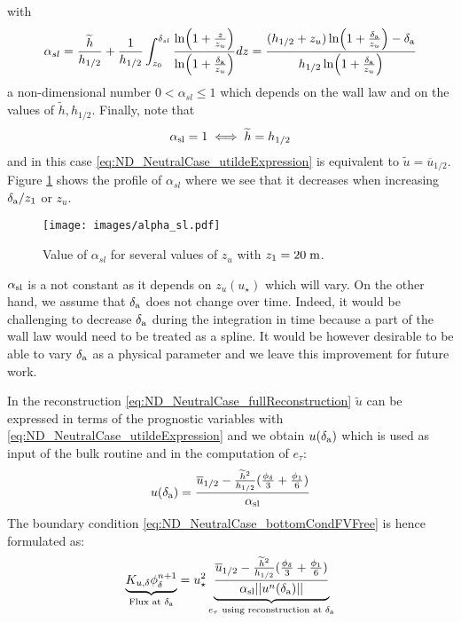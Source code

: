 with 
\begin{equation}
	\alpha_{sl} =
\frac{\widetilde{h}}{{h_{1/2}}} + \frac{1}{{h_{1/2}}}\int_{z_0}^{\delta_{sl}}
\frac{\ln(1+\frac{z}{z_{u}})}{\ln(1+\frac{\delta_{\rm a}}{z_{u}})}dz
= \frac{(h_{1/2} + z_{u})
\ln(1+\frac{\delta_{\rm a}}{z_{u}}) - \delta_{\rm a}}{
	h_{1/2}\ln(1+\frac{\delta_{\rm a}}{z_{u}})}
\end{equation}
a non-dimensional number $0 < \alpha_{sl} \leq 1$
which depends on the wall law and
on the values of $\widetilde{h}, h_{1/2}$. Finally, note that
\begin{equation}
	\alpha_{\rm sl} = 1 \iff \widetilde{h}=h_{1/2}
\end{equation}
and in this case \eqref{eq:ND_NeutralCase_utildeExpression} is
equivalent to $\widetilde{u} = \overline{u}_{1/2}$.
Figure \ref{fig:ND_NeutralCase_alpha_sl} shows the
profile of $\alpha_{sl}$ where we see that it decreases when
increasing $\delta_{\rm a}/z_1$ or $z_u$.
\begin{figure}[h!]
	\centering
	\texttt{[image: images/alpha\_sl.pdf]}
	\caption
	{ Value of $\alpha_{sl}$
	for several values of $z_u$ with $z_1=20\;{\rm m}$.
	}
	\label{fig:ND_NeutralCase_alpha_sl}
\end{figure}
\begin{remark}
$\alpha_{\rm sl}$ is a not constant as it depends on $z_u(u_\star)$
which will vary.
On the other hand, we assume that $\delta_{\rm a}$ does not change
over time. Indeed, it would be challenging to decrease
$\delta_{\rm a}$ during the integration in time because a part
of the wall law would need to be treated as a spline.
It would be however desirable to be able to vary $\delta_{\rm a}$
as a physical parameter and we leave this improvement for future work.
\end{remark}
%
In the reconstruction \eqref{eq:ND_NeutralCase_fullReconstruction}
$\widetilde{u}$ can be expressed in terms of the prognostic
variables with \eqref{eq:ND_NeutralCase_utildeExpression}
and we obtain $u(\delta_{\rm a})$ which is used as input
of the bulk routine and in the computation of $e_\tau$:
\begin{equation}
u(\delta_{\rm a})=\frac{\overline{u}_{1/2} -
	\frac{\widetilde{h}^2}{h_{1/2}}
	(\frac{\phi_{\delta}}{3} + \frac{\phi_1}{6})}
	{\alpha_{\rm sl}}
\end{equation}
The boundary condition \eqref{eq:ND_NeutralCase_bottomCondFVFree}
is hence formulated as:
\begin{equation}
	\label{eq:ND_NeutralCase_boundaryCondFVfree}
	\underbrace{K_{u,\delta} {\phi}^{n+1}_{\delta}}_{
		\text{Flux at } \delta_{\rm a}
	} = u_\star^2
	\underbrace{\frac{\overline{u}_{1/2} -
	\frac{\widetilde{h}^2}{h_{1/2}}
	(\frac{\phi_{\delta}}{3} + \frac{\phi_1}{6})}
	{\alpha_{\rm sl}||u^n(\delta_{\rm a}) ||}}_{
		e_\tau \text{ using reconstruction at } \delta_{\rm a}
	}
\end{equation}
